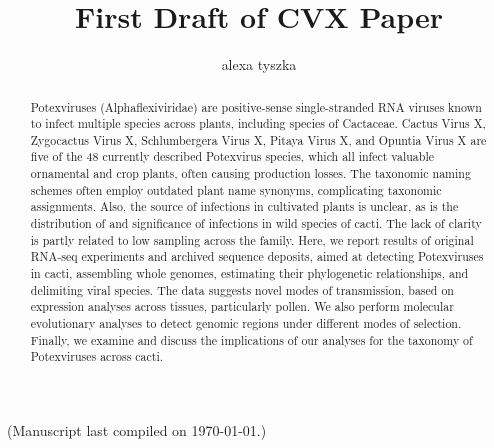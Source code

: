 \documentclass{article}
\title{First Draft of CVX Paper}
\author{alexa tyszka}
\date{}
\begin{document}



\maketitle

(Manuscript last compiled on \today.)


\begin{abstract}

Potexviruses (Alphaflexiviridae) are positive-sense single-stranded RNA viruses known to infect multiple species across plants, including species of Cactaceae. 
Cactus Virus X, Zygocactus Virus X, Schlumbergera Virus X, Pitaya Virus X, and Opuntia Virus X are five of the 48 currently described Potexvirus species, which all infect valuable ornamental and crop plants, often causing production losses. 
The taxonomic naming schemes often employ outdated plant name synonyms, complicating taxonomic assignments. Also, the source of infections in cultivated plants is unclear, as is the distribution of and significance of infections in wild species of cacti. 
The lack of clarity is partly related to low sampling across the family. 
Here, we report results of original RNA-seq experiments and archived sequence deposits, aimed at detecting Potexviruses in cacti, assembling whole genomes, estimating their phylogenetic relationships, and delimiting viral species. 
The data suggests novel modes of transmission, based on expression analyses across tissues, particularly pollen. 
We also perform molecular evolutionary analyses to detect genomic regions under different modes of selection. 
Finally, we examine and discuss the implications of our analyses for the taxonomy of Potexviruses across cacti.  
\end{abstract}
\end{document}
